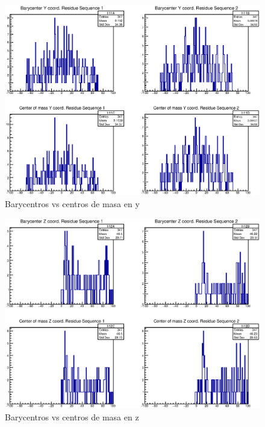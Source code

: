 \begin{figure}[htbp]
    \centering
    \includegraphics[width=1\linewidth]{./Figures/can2.eps}
    \caption[Barycentros vs centros de masa en y]{Barycentros vs centros de masa en y}
    \label{fig:cany}
\end{figure}

\begin{figure}[htbp]
    \centering
    \includegraphics[width=1\linewidth]{./Figures/can3.eps}
  \caption[Barycentros vs centros de masa en z]{Barycentros vs centros de masa en z}
    \label{fig:canz}
\end{figure}
